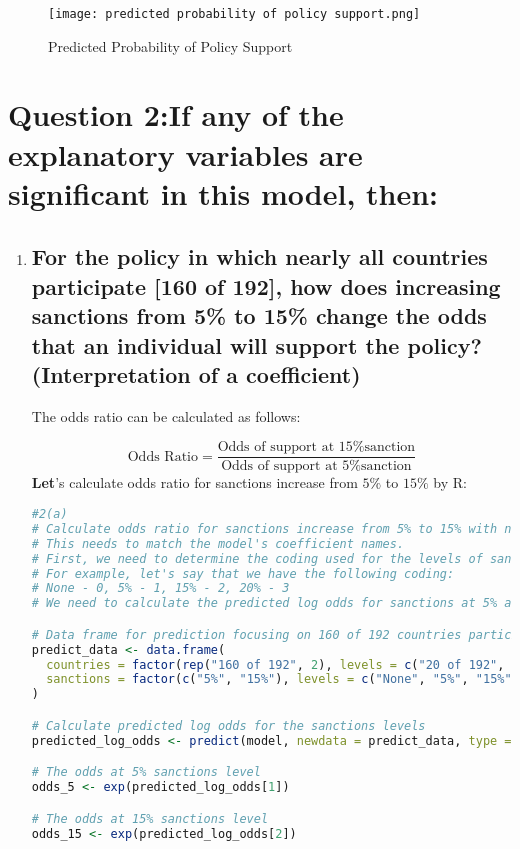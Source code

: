 \documentclass[12pt,letterpaper]{article}
\begin{document}
\begin{figure}[H]
\centering
\texttt{[image: predicted probability of policy support.png]}
\caption{Predicted Probability of Policy Support}
\label{fig:predicted-probability}
\end{figure}


	
\section*{Question 2:If any of the explanatory variables are significant in this model, then:}
	\begin{enumerate}
		\item
		\subsection*{For the policy in which nearly all countries participate [160 of 192], how does increasing sanctions from 5\% to 15\% change the odds that an individual will support the policy? (Interpretation of a coefficient)}
  
  The odds ratio can be calculated as follows:

\textbf{\[
\text{Odds Ratio} = \frac{\text{Odds of support at 15\% sanction}}{\text{Odds of support at 5\% sanction}}
\]
  Let}'s calculate odds ratio for sanctions increase from $5\%$ to $15\%$ by R:
  \begin{lstlisting}[language=R]
#2(a)
# Calculate odds ratio for sanctions increase from 5% to 15% with nearly full participation
# This needs to match the model's coefficient names.
# First, we need to determine the coding used for the levels of sanctions
# For example, let's say that we have the following coding:
# None - 0, 5% - 1, 15% - 2, 20% - 3
# We need to calculate the predicted log odds for sanctions at 5% and 15%

# Data frame for prediction focusing on 160 of 192 countries participating
predict_data <- data.frame(
  countries = factor(rep("160 of 192", 2), levels = c("20 of 192", "80 of 192", "160 of 192")),
  sanctions = factor(c("5%", "15%"), levels = c("None", "5%", "15%", "20%"))
)

# Calculate predicted log odds for the sanctions levels
predicted_log_odds <- predict(model, newdata = predict_data, type = "link")

# The odds at 5% sanctions level
odds_5 <- exp(predicted_log_odds[1])

# The odds at 15% sanctions level
odds_15 <- exp(predicted_log_odds[2])


\end{lstlisting}
\end{enumerate}
\end{document}
